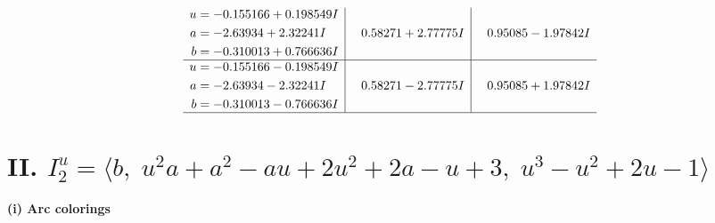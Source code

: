 \documentclass[1p]{elsarticle_modified}
\theoremstyle{definition}
\begin{document}
$$\begin{array}{c|c|c}
\begin{aligned}
u &= -0.155166 + 0.198549 I \\
a &= -2.63934 + 2.32241 I \\
b &= -0.310013 + 0.766636 I\end{aligned}
 & \phantom{-}0.58271 + 2.77775 I & \phantom{-}0.95085 - 1.97842 I \\ \hline\begin{aligned}
u &= -0.155166 - 0.198549 I \\
a &= -2.63934 - 2.32241 I \\
b &= -0.310013 - 0.766636 I\end{aligned}
 & \phantom{-}0.58271 - 2.77775 I & \phantom{-}0.95085 + 1.97842 I\\
 \hline 
 \end{array}$$\newpage\newpage\renewcommand{\arraystretch}{1}
\centering \section*{II. $I^u_{2}= \langle b,\;u^2 a+a^2- a u+2 u^2+2 a- u+3,\;u^3- u^2+2 u-1 \rangle$}
\flushleft \textbf{(i) Arc colorings}\\
\end{document}
